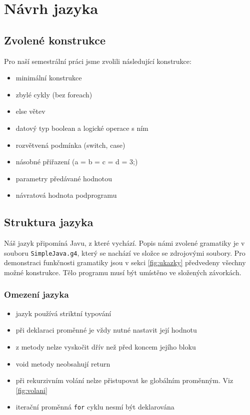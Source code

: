 \documentclass[12pt, a4paper]{article}
\begin{document}
\section{Návrh jazyka}
\subsection{Zvolené konstrukce}
Pro naší semestrální práci jsme zvolili následující konstrukce:
\begin{itemize}
\item minimální konstrukce
\item zbylé cykly (bez foreach)
\item else větev
\item datový typ boolean a logické operace s ním
\item rozvětvená podmínka (switch, case)
\item násobné přiřazení (a = b = c = d = 3;)
\item parametry předávané hodnotou
\item návratová hodnota podprogramu
\end{itemize}

\subsection{Struktura jazyka}
Náš jazyk připomíná Javu, z které vychází. Popis námi zvolené gramatiky je v souboru \texttt{SimpleJava.g4}, který se nachází ve složce se zdrojovými soubory. Pro demonstraci funkčnosti gramatiky jsou v sekci \ref{fig:ukazky} předvedeny všechny možné konstrukce. Tělo programu musí být umístěno ve složených závorkách.

\subsubsection{Omezení jazyka}
\begin{itemize}
\item jazyk používá striktní typování
\item při deklaraci proměnné je vždy nutné nastavit její hodnotu
\item z metody nelze vyskočit dřív než před koncem jejího bloku
\item void metody neobsahují return
\item při rekurzivním volání nelze přistupovat ke globálním proměnným. Viz \ref{fig:volani}
\item iterační proměnná \texttt{for} cyklu nesmí být deklarována
\end{itemize}
\end{document}
